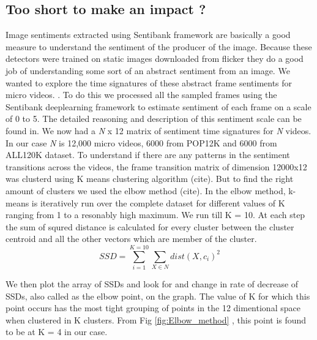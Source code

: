 \subsection{ Too short to make an impact ?}
Image sentiments extracted using Sentibank framework are basically a good measure to understand the sentiment of the producer of the image. Because these detectors were trained on static images downloaded from flicker they do a good job of understanding some sort of an abstract sentiment from an image. We wanted to explore the time signatures of these abstract frame sentiments for micro videos. . To do this  we processed all the sampled frames using the Sentibank deeplearning framework to estimate sentiment of each frame on a scale of 0 to 5. The detailed reasoning and description of this sentiment scale can be found in\cite{jou2015visual}. 
We now had a \textit{N} x 12 matrix of sentiment time signatures for \textit{N} videos. In our case \textit{N} is 12,000 micro videos, 6000 from POP12K and 6000 from ALL120K dataset. To understand if there are any patterns in the sentiment transitions across the videos, the frame transition matrix of dimension 12000x12 was clusterd using K means clustering algorithm (cite). But to find the right amount of clusters we used the elbow method (cite). In the elbow method, k-means is iteratively run over the complete dataset for different values of K ranging from 1 to a resonably high maximum. We run till K = 10. At each step the sum of squred distance is calculated for every cluster between the cluster centroid and all the other vectors which are member of the cluster. 
\begin{equation}
SSD = \sum_{i =1}^{K = 10} \sum_{X \in{N}}{dist(X,c_i)}^2
\end{equation}

We then plot the array of SSDs and look for and change in rate of decrease of SSDs, also called as the elbow point, on the graph. The value of K for which this point occurs has the most tight grouping of points in the 12 dimentional space when clustered in K clusters. From Fig \ref{fig:Elbow_method} , this point is found to be at K = 4 in our case. 


